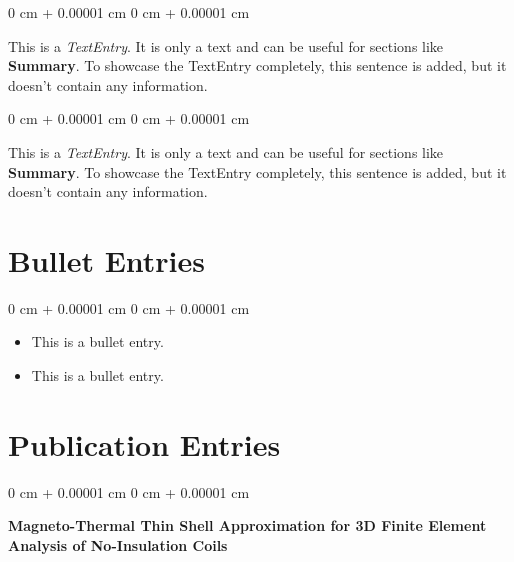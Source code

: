 \documentclass[10pt, letterpaper]{article}
\newenvironment{highlightsforbulletentries}{
    \begin{itemize}[
        topsep=0.10 cm,
        parsep=0.10 cm,
        partopsep=0pt,
        itemsep=0pt,
        leftmargin=10pt
    ]
}{
    \end{itemize}
} %
\newenvironment{onecolentry}{
    \begin{adjustwidth}{
        0 cm + 0.00001 cm
    }{
        0 cm + 0.00001 cm
    }
}{
    \end{adjustwidth}
} %
\begin{document}
        \vspace{0.2 cm}

        \begin{onecolentry}
            This is a \textit{TextEntry}. It is only a text and can be useful for sections like \textbf{Summary}. To showcase the TextEntry completely, this sentence is added, but it doesn't contain any information.
        \end{onecolentry}

        \vspace{0.2 cm}

        \begin{onecolentry}
            This is a \textit{TextEntry}. It is only a text and can be useful for sections like \textbf{Summary}. To showcase the TextEntry completely, this sentence is added, but it doesn't contain any information.
        \end{onecolentry}


    
    \section{Bullet Entries}

    \begin{onecolentry}
        \begin{highlightsforbulletentries}


        \item This is a bullet entry.

        \item This is a bullet entry.


        \end{highlightsforbulletentries}
    \end{onecolentry}

    \section{Publication Entries}



        
        \begin{samepage}
            \begin{onecolentry}
                \textbf{Magneto-Thermal Thin Shell Approximation for 3D Finite Element Analysis of No-Insulation Coils}
            \end{onecolentry}


        \end{samepage}
\end{document}
